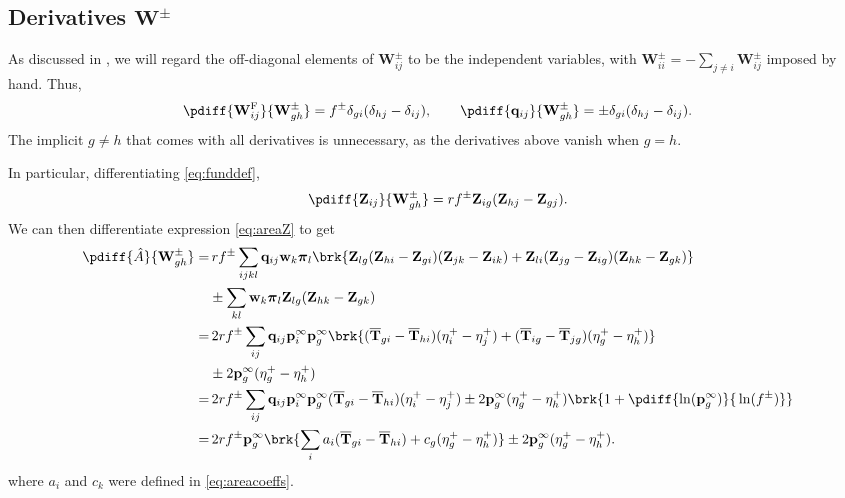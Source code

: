 \documentclass[12pt]{article}
\newcommand{\eq}{\mathbf{p}^\infty}
\newcommand{\fpt}{\mathbf{T}}
\newcommand{\fptb}{\overline{\fpt}}
\newcommand{\fund}{\mathbf{Z}}
\newcommand{\pib}{\boldsymbol{\pi}}
\newcommand{\w}{\mathbf{w}}
\newcommand{\W}{\mathbf{W}}
\newcommand{\enc}{\mathbf{q}}
\newcommand{\frg}{\W^{\mathrm{F}}}
\begin{document}
\subsection{Derivatives \wrt \texorpdfstring{$\W^\pm$}{W+/-}}\label{sec:deriv}

As discussed in ,
we will regard the off-diagonal elements of $\W^\pm_{ij}$ to be the independent variables,
with $\W^\pm_{ii}=-\sum_{j \neq i} \W^\pm_{ij}$ imposed by hand.
Thus,
%
\begin{equation}\label{eq:basicderivs}
  \pdiff{\frg_{ij}}{\W^\pm_{gh}} = f^\pm \delta_{gi}(\delta_{hj}-\delta_{ij}),
  \qquad
  \pdiff{\enc_{ij}}{\W^\pm_{gh}} = \pm\delta_{gi}(\delta_{hj}-\delta_{ij}).
\end{equation}
%
The implicit $g \neq h$ that comes with all derivatives is unnecessary, as the derivatives above vanish when $g=h$.

In particular, differentiating \eqref{eq:funddef},
%
\begin{equation}\label{eq:derivZ}
  \pdiff{\fund_{ij}}{\W^\pm_{gh}} = rf^\pm \fund_{ig} (\fund_{hj}-\fund_{gj}).
\end{equation}
%
We can then differentiate expression \eqref{eq:areaZ} to get
%
\begin{equation}\label{eq:derivA}
  \begin{aligned}
    \pdiff{\hat{A}}{\W^\pm_{gh}} =&\,
      rf^\pm \sum_{ijkl} \enc_{ij} \w_k \pib_l \brk{
         \fund_{lg}(\fund_{hi}-\fund_{gi})(\fund_{jk}-\fund_{ik}) + \fund_{li}(\fund_{jg}-\fund_{ig})(\fund_{hk}-\fund_{gk}) } \\
    &\pm \sum_{kl} \w_k \pib_l \fund_{lg} (\fund_{hk} - \fund_{gk}) \\
    =&\,
      2rf^\pm \sum_{ij} \enc_{ij} \eq_i \eq_g \brk{
         (\fptb_{gi}-\fptb_{hi})(\eta^+_{i}-\eta^+_{j}) +
         (\fptb_{ig}-\fptb_{jg})(\eta^+_{g}-\eta^+_{h}) } \\
      &\pm 2 \eq_g (\eta^+_g - \eta^+_h) \\
    =&\,
      2rf^\pm \sum_{ij} \enc_{ij} \eq_i \eq_g
         (\fptb_{gi}-\fptb_{hi})(\eta^+_{i}-\eta^+_{j})
      \pm 2 \eq_g (\eta^+_g - \eta^+_h)\brk{1+\pdiff{\ln(\eq_g)}{\,\ln(f^\pm)}} \\
    =&\,
      2rf^\pm \eq_g \brk{\sum_i a_i (\fptb_{gi}-\fptb_{hi}) + c_g (\eta^+_{g}-\eta^+_{h})}
      \pm 2 \eq_g (\eta^+_g - \eta^+_h). \\
  \end{aligned}
\end{equation}
%
where $a_i$ and $c_k$ were defined in \eqref{eq:areacoeffs}.
\end{document}
